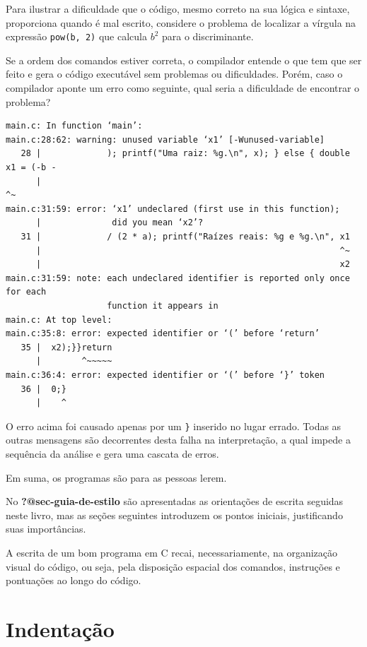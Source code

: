\documentclass[
  11pt,
  a4paper,
]{scrbook}
\begin{document}
Para ilustrar a dificuldade que o código, mesmo correto na sua lógica e
sintaxe, proporciona quando é mal escrito, considere o problema de
localizar a vírgula na expressão \texttt{pow(b,\ 2)} que calcula \(b^2\)
para o discriminante.

Se a ordem dos comandos estiver correta, o compilador entende o que tem
que ser feito e gera o código executável sem problemas ou dificuldades.
Porém, caso o compilador aponte um erro como seguinte, qual seria a
dificuldade de encontrar o problema?

\begin{verbatim}
main.c: In function ‘main’:
main.c:28:62: warning: unused variable ‘x1’ [-Wunused-variable]
   28 |             ); printf("Uma raiz: %g.\n", x); } else { double x1 = (-b -
      |                                                              ^~
main.c:31:59: error: ‘x1’ undeclared (first use in this function);
      |              did you mean ‘x2’?
   31 |             / (2 * a); printf("Raízes reais: %g e %g.\n", x1
      |                                                           ^~
      |                                                           x2
main.c:31:59: note: each undeclared identifier is reported only once for each
                    function it appears in
main.c: At top level:
main.c:35:8: error: expected identifier or ‘(’ before ‘return’
   35 |  x2);}}return
      |        ^~~~~~
main.c:36:4: error: expected identifier or ‘(’ before ‘}’ token
   36 |  0;}
      |    ^
\end{verbatim}

O erro acima foi causado apenas por um \texttt{\}} inserido no lugar
errado. Todas as outras mensagens são decorrentes desta falha na
interpretação, a qual impede a sequência da análise e gera uma cascata
de erros.

Em suma, os programas são para as pessoas lerem.

No \textbf{?@sec-guia-de-estilo} são apresentadas as orientações de
escrita seguidas neste livro, mas as seções seguintes introduzem os
pontos iniciais, justificando suas importâncias.

A escrita de um bom programa em C recai, necessariamente, na organização
visual do código, ou seja, pela disposição espacial dos comandos,
instruções e pontuações ao longo do código.

\section{Indentação}\label{indentauxe7uxe3o}
\end{document}
